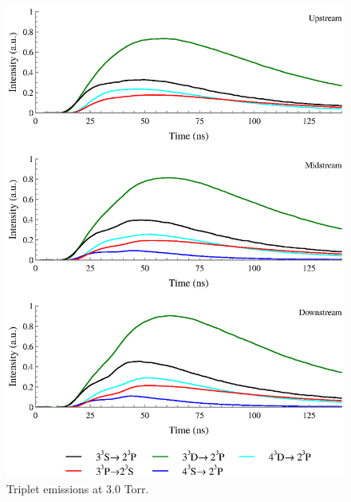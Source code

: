 \begin{figure}
  \centering
  \includegraphics{./chapters/extraem/figures/3torr_t.eps}
  \caption{Triplet emissions at 3.0 Torr.}
\end{figure}

